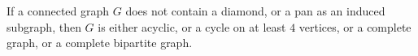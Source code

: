 \documentclass{svproc}
\begin{document}


%    
%    
%

\begin{lemma}
\label{lemma:characterization}
If a connected graph $G$ does not contain a diamond, or a pan as an induced subgraph, then $G$ is either acyclic, or a cycle on at least $4$ vertices, or a complete graph, or a complete bipartite graph.
\end{lemma}
\end{document}
